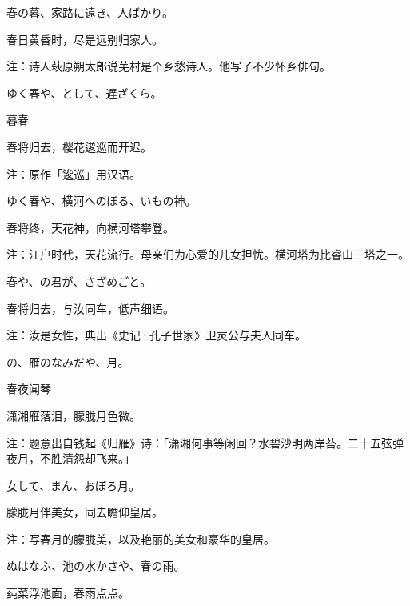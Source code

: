\begin{haiku}
    {\FH 春の暮、家路に遠き、人ばかり。}

    {\FK 春日黄昏时，尽是远别归家人。}

    {\FT 注：诗人萩原朔太郎说芜村是个乡愁诗人。他写了不少怀乡俳句。}
\end{haiku}

\begin{haiku}
    {\FH ゆく春や、として、遅ざくら。}

    {\FK 暮春}

    {\FK 春将归去，樱花逡巡而开迟。}

    {\FT 注：原作「逡巡」用汉语。}
\end{haiku}

\begin{haiku}
    {\FH ゆく春や、横河へのぼる、いもの神。}

    {\FK 春将终，天花神，向横河塔攀登。}

    {\FT 注：江户时代，天花流行。母亲们为心爱的儿女担忧。横河塔为比睿山三塔之一。}
\end{haiku}

\begin{haiku}
    {\FH 春や、の君が、さざめごと。}

    {\FK 春将归去，与汝同车，低声细语。}

    {\FT 注：汝是女性，典出《史记·孔子世家》卫灵公与夫人同车。}
\end{haiku}

\begin{haiku}
    {\FH {}の、雁のなみだや、月。}

    {\FK 春夜闻琴}

    {\FK 潇湘雁落泪，朦胧月色微。}

    {\FT 注：题意出自钱起《归雁》诗：「潇湘何事等闲回？水碧沙明两岸苔。二十五弦弹夜月，不胜清怨却飞来。」}
\end{haiku}

\begin{haiku}
    {\FH 女して、まん、おぼろ月。}

    {\FK 朦胧月伴美女，同去瞻仰皇居。}

    {\FT 注：写春月的朦胧美，以及艳丽的美女和豪华的皇居。}
\end{haiku}

\begin{haiku}
    {\FH ぬはなふ、池の水かさや、春の雨。}

    {\FK 莼菜浮池面，春雨点点。}
\end{haiku}


